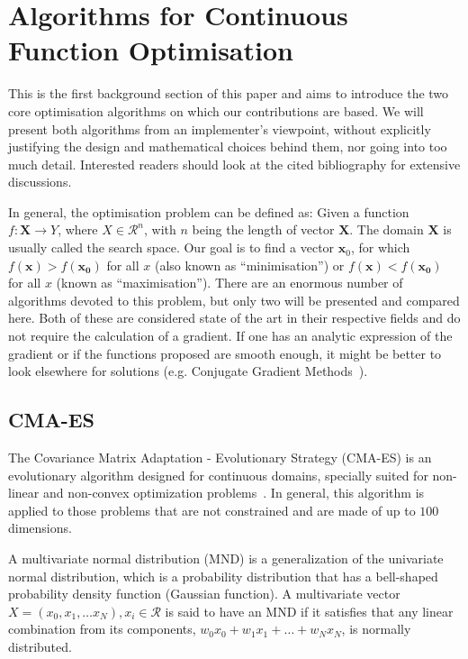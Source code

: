 \documentclass[conference]{IEEEtran}
\begin{document}
\section{Algorithms for Continuous Function Optimisation} \label{sec:Optimisation}

This is the first background section of this paper and aims to introduce the two core optimisation algorithms on which our contributions are based. We will present both algorithms from an implementer's viewpoint, without explicitly justifying the design and mathematical choices behind them, nor going into too much detail. Interested readers should look at the cited bibliography for extensive discussions. 

In general, the optimisation problem can be defined as: Given a function $f:\bm{X}\rightarrow Y $, where $X \in \mathcal{R}^n$, with $n$ being the length of vector $\bm{X}$. The domain $\bm{X}$ is usually called the search space. Our goal is to find a vector $\bm{x}_0$, for which $f(\bm{x}) > f(\bm{x_0}) $ for all $x$ (also known as ``minimisation'') or $f(\bm{x}) < f(\bm{x_0})$ for all $x$ (known as ``maximisation'').
There are an enormous number of algorithms devoted to this problem, but only two will be presented and compared here. Both of these are considered state of the art in their respective fields and do not require the calculation of a gradient. If one has an analytic expression of the gradient or if the functions proposed are smooth enough, it might be better to look elsewhere for solutions (e.g. Conjugate Gradient Methods~\cite{shewchuk1994introduction}).

\subsection{CMA-ES} \label{sec:algCma}



The Covariance Matrix Adaptation - Evolutionary Strategy (CMA-ES) is an evolutionary algorithm designed for continuous domains, specially suited for non-linear and non-convex optimization problems~\cite{Hansen2006}. In general, this algorithm is applied to those problems that are not constrained and are made of up to $100$ dimensions.%

A multivariate normal distribution (MND) is a generalization of the univariate normal distribution, which is a probability distribution that has a bell-shaped probability density function (Gaussian function). A multivariate vector $X = (x_0, x_1, \dots x_N), x_i \in \mathcal{R}$ is said to have an MND if it satisfies that any linear combination from its components, $w_0x_0 + w_1x_1 + \dots + w_Nx_N$, is normally distributed.
\end{document}
